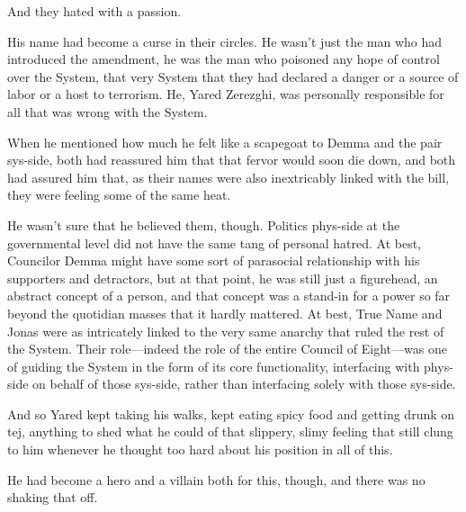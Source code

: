 And they hated with a passion.

His name had become a curse in their circles. He wasn't just the man who had introduced the amendment, he was the man who poisoned any hope of control over the System, that very System that they had declared a danger or a source of labor or a host to terrorism. He, Yared Zerezghi, was personally responsible for all that was wrong with the System.

When he mentioned how much he felt like a scapegoat to Demma and the pair sys-side, both had reassured him that that fervor would soon die down, and both had assured him that, as their names were also inextricably linked with the bill, they were feeling some of the same heat.

He wasn't sure that he believed them, though. Politics phys-side at the governmental level did not have the same tang of personal hatred. At best, Councilor Demma might have some sort of parasocial relationship with his supporters and detractors, but at that point, he was still just a figurehead, an abstract concept of a person, and that concept was a stand-in for a power so far beyond the quotidian masses that it hardly mattered. At best, True Name and Jonas were as intricately linked to the very same anarchy that ruled the rest of the System. Their role---indeed the role of the entire Council of Eight---was one of guiding the System in the form of its core functionality, interfacing with phys-side on behalf of those sys-side, rather than interfacing solely with those sys-side.

And so Yared kept taking his walks, kept eating spicy food and getting drunk on tej, anything to shed what he could of that slippery, slimy feeling that still clung to him whenever he thought too hard about his position in all of this.

He had become a hero and a villain both for this, though, and there was no shaking that off.

